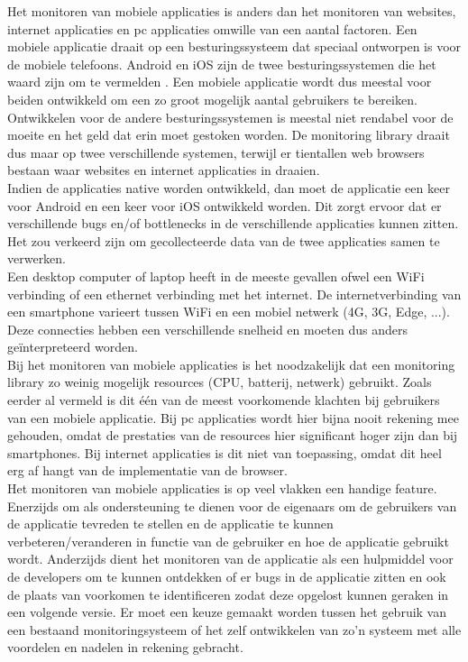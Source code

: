 Het monitoren van mobiele applicaties is anders dan het monitoren van websites, internet applicaties en pc applicaties omwille van een aantal factoren. Een mobiele applicatie draait op een besturingssysteem dat speciaal ontworpen is voor de mobiele telefoons. Android en iOS zijn de twee besturingssystemen die het waard zijn om te vermelden \cite{MarketShare}. Een mobiele applicatie wordt dus meestal voor beiden ontwikkeld om een zo groot mogelijk aantal gebruikers te bereiken. Ontwikkelen voor de andere besturingssystemen is meestal niet rendabel voor de moeite en het geld dat erin moet gestoken worden. De monitoring library draait dus maar op twee verschillende systemen, terwijl er tientallen web browsers bestaan waar websites en internet applicaties in draaien. \\

Indien de applicaties native worden ontwikkeld, dan moet de applicatie een keer voor Android en een keer voor iOS ontwikkeld worden. Dit zorgt ervoor dat er verschillende bugs en/of bottlenecks in de verschillende applicaties kunnen zitten. Het zou verkeerd zijn om gecollecteerde data van de twee applicaties samen te verwerken. \\
Een desktop computer of laptop heeft in de meeste gevallen ofwel een WiFi verbinding of een ethernet verbinding met het internet. De internetverbinding van een smartphone varieert tussen WiFi en een mobiel netwerk (4G, 3G, Edge, ...). Deze connecties hebben een verschillende snelheid en moeten dus anders ge\"interpreteerd worden. \\

Bij het monitoren van mobiele applicaties is het noodzakelijk dat een monitoring library zo weinig mogelijk resources (CPU, batterij, netwerk) gebruikt. Zoals eerder al vermeld is dit \'e\'en van de meest voorkomende klachten bij gebruikers van een mobiele applicatie. Bij pc applicaties wordt hier bijna nooit rekening mee gehouden, omdat de prestaties van de resources hier significant hoger zijn dan bij smartphones. Bij internet applicaties is dit niet van toepassing, omdat dit heel erg af hangt van de implementatie van de browser. \\


Het monitoren van mobiele applicaties is op veel vlakken een handige feature. Enerzijds om als ondersteuning te dienen voor de eigenaars om de gebruikers van de applicatie tevreden te stellen en de applicatie te kunnen verbeteren/veranderen in functie van de gebruiker en hoe de applicatie gebruikt wordt. Anderzijds dient het monitoren van de applicatie als een hulpmiddel voor de developers om te kunnen ontdekken of er bugs in de applicatie zitten en ook de plaats van voorkomen te identificeren zodat deze opgelost kunnen geraken in een volgende versie. Er moet een keuze gemaakt worden tussen het gebruik van een bestaand monitoringsysteem of het zelf ontwikkelen van zo'n systeem met alle voordelen en nadelen in rekening gebracht. \\


